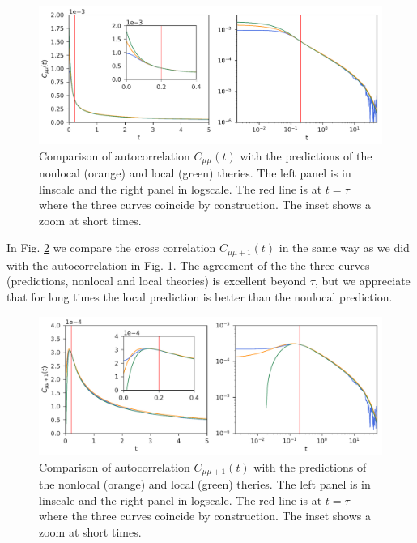 \documentclass[b5paper,openright,10pt]{book}
\begin{document}
\begin{figure}[h!]
  \centering
\includegraphics[width=\linewidth]{Predictionsmumu-PBC}
\caption[Comparison of autocorrelation $C_{\mu\mu}$ with the predicions for an unconfined fluid]{Comparison of autocorrelation $C_{\mu\mu}(t)$ with the predictions of the nonlocal (orange) and local (green) theries. The left panel is in linscale and the right panel in logscale. The red line is at $t=\tau$ where the three curves coincide by construction. The inset shows a zoom at short times.}
\label{fig:Predictionsmumu-PBC}
\end{figure}

In Fig. \ref{fig:Predictionsmumu+1-PBC} we compare the cross correlation $C_{\mu\mu+1}(t)$ in the same way as we did with the autocorrelation in Fig. \ref{fig:Predictionsmumu-PBC}. The agreement of the the three curves (predictions, nonlocal and local theories) is excellent beyond $\tau$, but we appreciate that for long times the local prediction is better than the nonlocal prediction. 

\begin{figure}[h!]
  \centering
\includegraphics[width=\linewidth]{Predictionsmumu+1-PBC}
\caption[Comparison of cross correlation $C_{\mu\mu+1}$ with the predicions for an unconfined fluid]{Comparison of autocorrelation $C_{\mu\mu+1}(t)$ with the predictions of the nonlocal (orange) and local (green) theries. The left panel is in linscale and the right panel in logscale. The red line is at $t=\tau$ where the three curves coincide by construction. The inset shows a zoom at short times.}
\label{fig:Predictionsmumu+1-PBC}
\end{figure}
\end{document}
